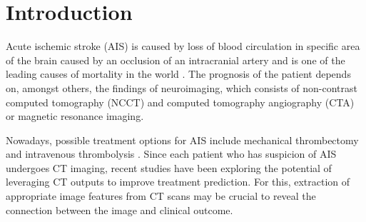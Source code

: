 \documentclass[preprint,12pt]{elsarticle}
\begin{document}
\section{Introduction}
\label{sec1}

Acute ischemic stroke (AIS) is caused by loss of blood circulation in specific area of the brain caused by an occlusion of an intracranial artery and is one of the leading causes of mortality in the world \cite{Phipps2020}. The prognosis of the patient depends on, amongst others, the findings of neuroimaging, which consists of non-contrast computed tomography (NCCT) and computed tomography angiography (CTA) or magnetic resonance imaging.

Nowadays, possible treatment options for AIS include mechanical thromb\-ec\-to\-my and intravenous thrombolysis \cite{Powers2020}.  Since each patient who has suspicion of AIS undergoes CT imaging, recent studies have been exploring the potential of leveraging CT outputs to improve treatment prediction. For this, extraction of appropriate image features from CT scans may be crucial to reveal the connection between the image and clinical outcome. 
\end{document}
